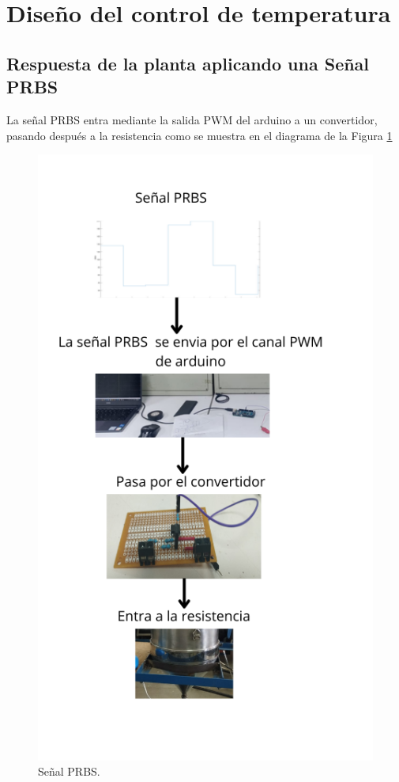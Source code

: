 \documentclass[12pt]{article}
\begin{document}




		
	
	
	\section{Diseño del control de temperatura}
	
	\label{diseño del control de temp}
	
	
	
	\subsection{Respuesta de la planta aplicando una Señal PRBS}
	
	
	La señal PRBS entra  mediante la salida PWM del arduino a un convertidor, pasando después a la resistencia como se muestra en el diagrama de la Figura \ref{ diagrama_prbs}
	
	\begin{figure}[h!]
		\centering
		\includegraphics[width=.4\linewidth]{imagenes/diagrama_PRBS}
		\caption{Señal PRBS. }
		\label{ diagrama_prbs}
	\end{figure}
	
\end{document}
